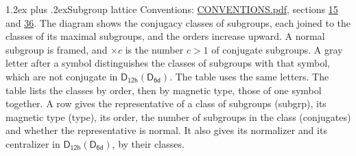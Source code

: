 \documentclass[10pt,a4paper]{article}
\makeatletter
\renewcommand\section{\@startsection{section}{1}{\z@}{-3ex plus -1ex minus -.2ex}%
  {1.2ex plus .2ex}{\normalfont\large\sffamily\bfseries\color{parttitle}}}
\numberwithin{equation}{section}
\newcommand{\grp}[1]{\mathsf{#1}}
\makeatother
\begin{document}
\section{Subgroup lattice}\label{s:subgroups}
Conventions: \href{../../CONVENTIONS.pdf}{CONVENTIONS.pdf}, sections \href{../../../rotation/CONVENTIONS.pdf\#conv.15}{15} and \href{../../CONVENTIONS.pdf\#conv.36}{36}.
The diagram shows the conjugacy classes of subgroups, each joined to the classes of its maximal subgroups, and the orders increase upward. \label{n:index.conjugates.c}\label{n:mark.conjugates}A normal subgroup is framed, and ${\times}c$ is the number $c > 1$ of conjugate subgroups. \label{n:mark.letter}A gray letter after a symbol distinguishes the classes of subgroups with that symbol, which are not conjugate in $\grp{D_{12h}}(\grp{D_{6d}})$. The table uses the same letters. The table lists the classes by order, then by magnetic type, those of one symbol together. \label{n:head.subgroup}\label{n:head.magnetic.type}\label{n:head.order}\label{n:head.conjugates}\label{n:head.normal}A row gives the representative of a class of subgroups (subgrp), its magnetic type (type), its order, the number of subgroups in the class (conjugates) and whether the representative is normal. \label{n:head.normalizer}\label{n:head.centralizer}It also gives its normalizer and its centralizer in $\grp{D_{12h}}(\grp{D_{6d}})$, by their classes. 
\end{document}
